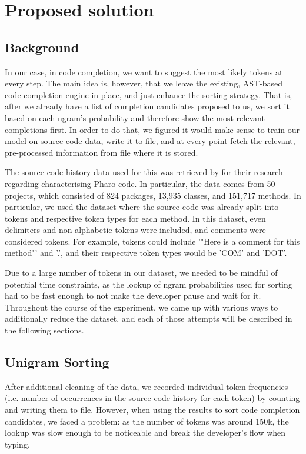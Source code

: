 \chapter{Proposed solution}
\label{chap:Proposed solution}

\section{Background}
In our case, in code completion, we want to suggest the most likely tokens at every step. The main idea is, however, that we leave the existing, AST-based code completion engine in place, and just enhance the sorting strategy. That is, after we already have a list of completion candidates proposed to us, we sort it based on each ngram's probability and therefore show the most relevant completions first. In order to do that, we figured it would make sense to train our model on source code data, write it to file, and at every point fetch the relevant, pre-processed information from file where it is stored.

The source code history data used for this was retrieved by \cite{Zait20a} for their research regarding characterising Pharo code. In particular, the data comes from 50 projects, which consisted of 824 packages, 13,935 classes, and 151,717 methods. In particular, we used the dataset where the source code was already split into tokens and respective token types for each method. In this dataset, even delimiters and non-alphabetic tokens were included, and comments were considered tokens. For example, tokens could include '"Here is a comment for this method"' and '.', and their respective token types would be 'COM' and 'DOT'.

Due to a large number of tokens in our dataset, we needed to be mindful of potential time constraints, as the lookup of ngram probabilities used for sorting had to be fast enough to not make the developer pause and wait for it. Throughout the course of the experiment, we came up with various ways to additionally reduce the dataset, and each of those attempts will be described in the following sections.

\section{Unigram Sorting}
After additional cleaning of the data, we recorded individual token frequencies (i.e. number of occurrences in the source code history for each token) by counting and writing them to file. However, when using the results to sort code completion candidates, we faced a problem: as the number of tokens was around 150k, the lookup was slow enough to be noticeable and break the developer's flow when typing. 

